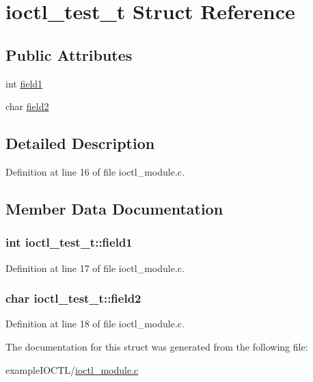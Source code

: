 \hypertarget{structioctl__test__t}{\section{ioctl\-\_\-test\-\_\-t Struct Reference}
\label{structioctl__test__t}
}
\subsection*{Public Attributes}
\begin{DoxyCompactItemize}
\item 
int \hyperlink{structioctl__test__t_a936a581614a2738510b8749c775cfba0}{field1}
\item 
char \hyperlink{structioctl__test__t_aa4c7455ffe6658d68d89b30fa6217363}{field2}
\end{DoxyCompactItemize}


\subsection{Detailed Description}


Definition at line 16 of file ioctl\-\_\-module.\-c.



\subsection{Member Data Documentation}
\hypertarget{structioctl__test__t_a936a581614a2738510b8749c775cfba0}{
\subsubsection[{field1}]{\setlength{\rightskip}{0pt plus 5cm}int ioctl\-\_\-test\-\_\-t\-::field1}}\label{structioctl__test__t_a936a581614a2738510b8749c775cfba0}


Definition at line 17 of file ioctl\-\_\-module.\-c.

\hypertarget{structioctl__test__t_aa4c7455ffe6658d68d89b30fa6217363}{
\subsubsection[{field2}]{\setlength{\rightskip}{0pt plus 5cm}char ioctl\-\_\-test\-\_\-t\-::field2}}\label{structioctl__test__t_aa4c7455ffe6658d68d89b30fa6217363}


Definition at line 18 of file ioctl\-\_\-module.\-c.



The documentation for this struct was generated from the following file\-:\begin{DoxyCompactItemize}
\item 
example\-I\-O\-C\-T\-L/\hyperlink{ioctl__module_8c}{ioctl\-\_\-module.\-c}\end{DoxyCompactItemize}
